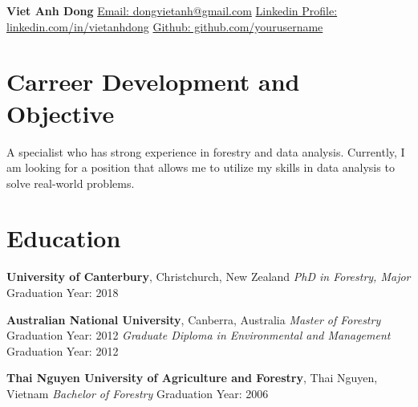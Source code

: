 \documentclass[a4paper,12pt]{article}
\begin{document}
\begin{center}
    {\LARGE \textbf{Viet Anh Dong}}
    \vspace{1mm} \newline
    \href{mailto:dongvietanh@gmail.com}{Email: dongvietanh@gmail.com} \newline
    \href{https://www.linkedin.com/in/vietanhdong}{Linkedin Profile: linkedin.com/in/vietanhdong} \newline
    \href{https://github.com/yourusername}{Github: github.com/yourusername} \newline
\end{center}

\section*{Carreer Development and Objective}
A specialist who has strong experience in forestry and data analysis. \newline
Currently, I am looking for a position that allows me to utilize my skills in data analysis to solve real-world problems.


\section*{Education}
\textbf{University of Canterbury}, Christchurch, New Zealand \newline
\textit{PhD in Forestry, Major} \hfill Graduation Year: 2018 \newline

\par %
\noindent
\textbf{Australian National University}, Canberra, Australia \newline
\textit{Master of Forestry} \hfill Graduation Year: 2012 \newline
\textit{Graduate Diploma in Environmental and Management} \hfill Graduation Year: 2012 \newline

\par %
\noindent
\textbf{Thai Nguyen University of Agriculture and Forestry}, Thai Nguyen, Vietnam \newline
\textit{Bachelor of Forestry} \hfill Graduation Year: 2006
\end{document}
